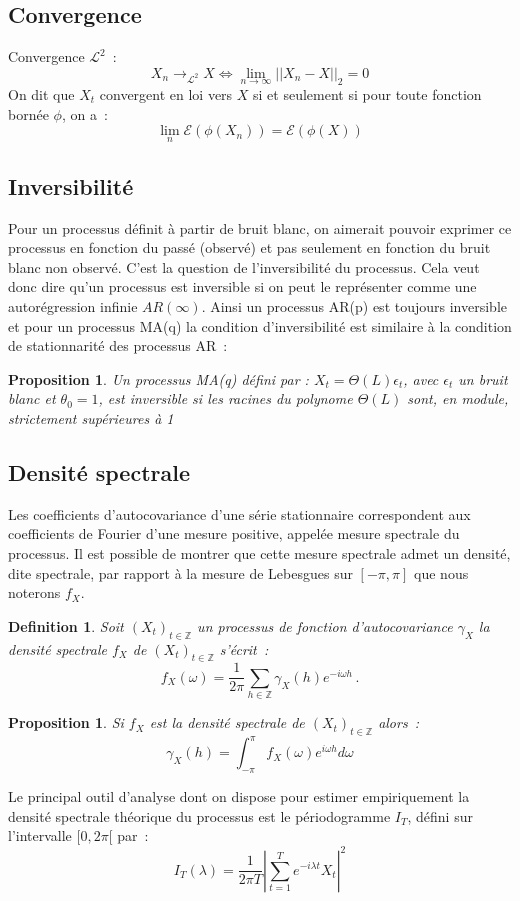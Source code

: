 \documentclass[11pt]{scrartcl} %
\newtheorem{Def}[theorem]{Definition}
\newtheorem{pro}[theorem]{Proposition}
\newcommand{\Xt}{\left(X_t\right)_{t\in\mathbb{Z}}}
\begin{document}
\subsection{Convergence}
Convergence $\mathcal{L}^2$~:
$$
X_n\rightarrow_{\mathcal{L^2}} X \Leftrightarrow  \lim_{n\rightarrow \infty}||X_n-X||_2=0
$$
On dit que $X_t$ convergent en loi vers $X$ si et seulement si pour toute fonction bornée $\phi$, on a~:~
$$
\lim_{n}\mathcal{E}(\phi(X_n))=\mathcal{E}\left(\phi(X)\right)
$$
\subsection{Inversibilité}
Pour un processus définit à partir de bruit blanc, on aimerait pouvoir exprimer ce processus en fonction du passé (observé) et pas seulement en fonction du bruit blanc non observé. C'est la question de l'inversibilité du processus. Cela veut donc dire qu'un processus est inversible si on peut le représenter comme une autorégression infinie $AR(\infty)$. Ainsi un processus AR(p) est toujours inversible et pour un processus MA(q) la condition d'inversibilité est similaire à la condition de stationnarité des processus AR~:
\begin{pro}
Un processus MA(q) défini par : $X_t=\Theta(L)\epsilon_t$, avec $\epsilon_t$ un bruit blanc et $\theta_0=1$, est inversible si les racines du polynome $ \Theta(L)$ sont, en module, strictement supérieures à 1
\end{pro}
\subsection{Densité spectrale}
Les coefficients d'autocovariance d'une série stationnaire correspondent aux coefficients de Fourier d'une mesure positive, appelée mesure spectrale du processus. Il est possible de montrer que cette mesure spectrale admet un densité, dite spectrale, par rapport à la mesure de Lebesgues sur $[-\pi,\pi]$ que nous noterons $f_X$.
\begin{Def}
Soit $\Xt$ un processus de fonction d'autocovariance $\gamma_X$ la densité spectrale $f_X$ de $\Xt$ s'écrit~:
$$
f_X(\omega) = \frac{1}{2\pi}\sum_{h\in\mathbb{Z}}\gamma_X(h)e^{-i\omega h}\,.
$$
\end{Def}
\begin{pro}
Si $f_X$ est la densité spectrale de $\Xt$ alors~:
$$
\gamma_X(h)=\int_{-\pi}^{\pi}f_X(\omega)e^{i\omega h}d\omega
$$
\end{pro}
Le principal outil d'analyse dont on dispose pour estimer empiriquement la densité spectrale théorique du processus est le périodogramme $I_T$, défini sur l'intervalle $[0,2\pi[$ par~:
$$
I_T(\lambda)=\frac{1}{2\pi T}\left|\sum_{t=1}^Te^{-i\lambda t}X_t\right|^2
$$
\end{document}

